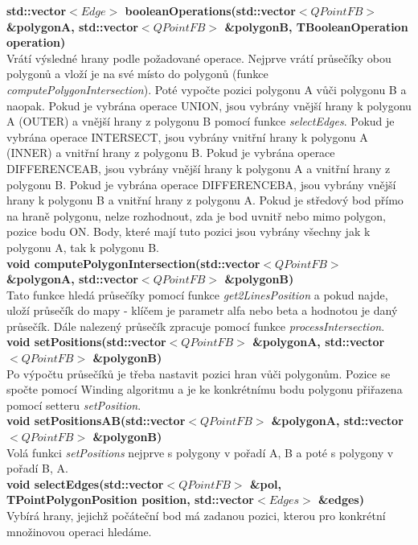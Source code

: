 \documentclass[a4paper,11pt,twoside]{article}
\begin{document}
\noindent\textbf{std::vector$<Edge>$ booleanOperations(std::vector$<QPointFB>$ \&polygonA,  std::vector$<QPointFB>$ \&polygonB, TBooleanOperation operation)}\\
Vrátí výsledné hrany podle požadované operace. Nejprve vrátí průsečíky obou polygonů a vloží je na své místo do polygonů (funkce \textit{computePolygonIntersection}). Poté vypočte pozici polygonu A vůči polygonu B a naopak. Pokud je vybrána operace UNION, jsou vybrány vnější hrany k polygonu A (OUTER) a vnější hrany z polygonu B pomocí funkce \textit{selectEdges}. Pokud je vybrána operace INTERSECT, jsou vybrány vnitřní hrany k polygonu A (INNER) a vnitřní hrany z polygonu B. Pokud je vybrána operace DIFFERENCEAB, jsou vybrány vnější hrany k polygonu A a vnitřní hrany z polygonu B. Pokud je vybrána operace DIFFERENCEBA, jsou vybrány vnější hrany k polygonu B a vnitřní hrany z polygonu A.  Pokud je středový bod přímo na hraně polygonu, nelze rozhodnout, zda je bod uvnitř nebo mimo polygon, pozice bodu ON. Body, které mají tuto pozici jsou vybrány všechny jak k polygonu A, tak k polygonu B.\\

\newpage
\vspace*{-1cm}
\noindent\textbf{void computePolygonIntersection(std::vector$<QPointFB>$ \&polygonA, std::vector$<QPointFB>$ \&polygonB)}\\
Tato funkce hledá průsečíky pomocí funkce \textit{get2LinesPosition} a pokud najde, uloží průsečík do mapy - klíčem je parametr alfa nebo beta a hodnotou je daný průsečík. Dále nalezený průsečík zpracuje pomocí funkce \textit{processIntersection}.\\

\noindent\textbf{void setPositions(std::vector$<QPointFB>$ \&polygonA, std::vector$<QPointFB>$ \&polygonB)}\\
Po výpočtu průsečíků je třeba nastavit pozici hran vůči polygonům. Pozice se spočte pomocí Winding algoritmu a je ke konkrétnímu bodu polygonu přiřazena pomocí setteru \textit{setPosition}.\\

\noindent\textbf{void setPositionsAB(std::vector$<QPointFB>$ \&polygonA, std::vector$<QPointFB>$ \&polygonB)}\\
Volá funkci \textit{setPositions} nejprve s polygony v pořadí A, B a poté s polygony v pořadí B, A.\\

\noindent\textbf{void selectEdges(std::vector$<QPointFB>$ \&pol, TPointPolygonPosition position, std::vector$<Edges>$ \&edges)}\\
Vybírá hrany, jejichž počáteční bod má zadanou pozici, kterou pro konkrétní množinovou operaci hledáme.
\end{document}
